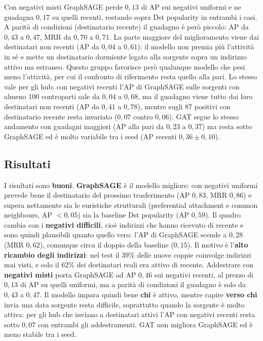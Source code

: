 \documentclass[11pt]{article}
\begin{document}
Con negativi misti GraphSAGE perde $0{,}13$ di AP sui negativi uniformi e
ne guadagna $0{,}17$ su quelli recenti, restando sopra Dst popularity in
entrambi i casi. A parità di condizioni (destinatario recente) il guadagno
è però piccolo: AP da $0{,}43$ a $0{,}47$, MRR da $0{,}70$ a $0{,}71$. La
parte maggiore del miglioramento viene dai destinatari non recenti (AP da
$0{,}04$ a $0{,}61$): il modello non premia più l'attività in sé e mette un
destinatario dormiente legato alla sorgente sopra un indirizzo attivo ma
estraneo. Questo gruppo favorisce però qualunque modello che pesi meno
l'attività, per cui il confronto di riferimento resta quello alla pari.
Lo stesso vale per gli hub: con negativi recenti l'AP di GraphSAGE sulle
sorgenti con almeno 100 controparti sale da $0{,}04$ a $0{,}68$, ma il
guadagno viene tutto dai loro destinatari non recenti (AP da $0{,}41$ a
$0{,}78$), mentre sugli 87 positivi con destinatario recente resta
invariato ($0{,}07$ contro $0{,}06$). GAT
segue lo stesso andamento con guadagni maggiori (AP alla pari da $0{,}23$ a
$0{,}37$) ma resta sotto GraphSAGE ed è molto variabile tra i seed (AP
recenti $0{,}36 \pm 0{,}10$).

\subsection{Risultati}
I risultati sono \textbf{buoni}. \textbf{GraphSAGE} è il modello migliore: con negativi
uniformi prevede bene il destinatario del prossimo trasferimento (AP $0{,}83$,
MRR $0{,}86$) e supera nettamente sia le euristiche strutturali (preferential
attachment e common neighbours, AP $< 0{,}05$) sia la baseline Dst popularity
(AP $0{,}59$). Il quadro cambia con i \textbf{negativi difficili}, cioè indirizzi
che hanno ricevuto di recente e sono quindi plausibili quanto quello vero:
l'AP di GraphSAGE scende a $0{,}28$ (MRR $0{,}62$), comunque circa il doppio
della baseline ($0{,}15$). Il motivo è l'\textbf{alto ricambio degli indirizzi}:
nel test il 39\% delle nuove coppie coinvolge indirizzi mai visti, e solo
il 62\% dei destinatari reali era attivo di recente. Addestrare con \textbf{negativi misti} porta GraphSAGE ad AP $0{,}46$
sui negativi recenti, al prezzo di $0{,}13$ di AP su quelli uniformi, ma a
parità di condizioni il guadagno è solo da $0{,}43$ a $0{,}47$. Il modello
impara quindi bene \textbf{chi} è attivo, mentre capire \textbf{verso chi} invia una data
sorgente resta difficile, soprattutto quando la sorgente è molto attiva:
per gli hub che inviano a destinatari attivi l'AP con negativi recenti
resta sotto $0{,}07$ con entrambi gli addestramenti. GAT non migliora
GraphSAGE ed è meno stabile tra i seed.
\end{document}
